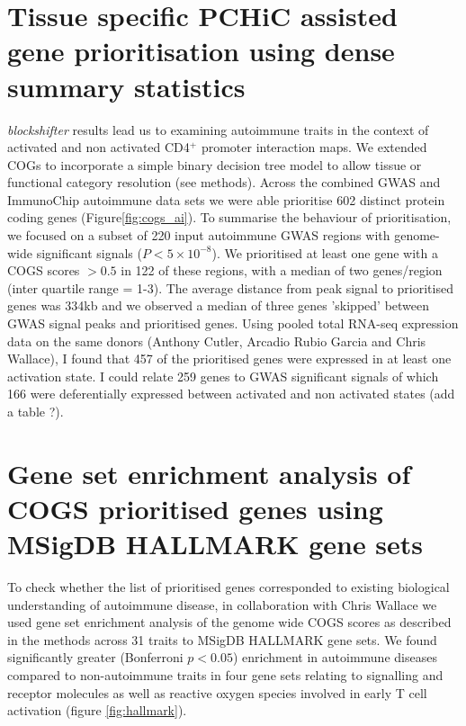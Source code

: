 \documentclass[a4paper,11pt]{report}
\begin{document}
\section{Tissue specific PCHiC assisted gene prioritisation using dense summary statistics}
\textit{blockshifter} results lead us to examining autoimmune traits in the context of activated and non activated CD4$^{+}$ promoter interaction maps. We extended COGs to  incorporate a simple binary decision tree model to allow tissue or functional category resolution (see methods).  Across the combined GWAS and ImmunoChip autoimmune data sets we were able prioritise 602 distinct protein coding genes  (Figure\ref{fig:cogs_ai}). To summarise the behaviour of prioritisation, we focused on a subset of 220 input autoimmune GWAS regions with genome-wide significant signals ($P<5 \times 10^{-8}$). We prioritised at least one gene with a COGS scores $>0.5$ in 122 of these regions, with a median of two genes/region (inter quartile range = 1-3). The average distance from peak signal to prioritised genes was 334kb and we observed a median of three genes 'skipped' between GWAS signal peaks and prioritised genes. Using pooled total RNA-seq expression data on the same donors (Anthony Cutler, Arcadio Rubio Garcia and Chris Wallace), I found that 457 of the prioritised genes were expressed in at least one activation state. I could relate 259 genes to GWAS significant signals of which 166 were deferentially expressed between activated and non activated states (add a table ?).

\section{Gene set enrichment analysis of COGS prioritised genes using MSigDB HALLMARK gene sets} 

To check whether the list of prioritised genes corresponded to existing biological understanding of autoimmune disease, in collaboration with Chris Wallace we used gene set enrichment analysis of the genome wide COGS scores as described in the methods  across 31 traits to MSigDB HALLMARK gene sets. We found significantly greater (Bonferroni $p<0.05$) enrichment in autoimmune diseases compared to non-autoimmune traits in four gene sets relating to signalling and receptor molecules as well as reactive oxygen species involved in early T cell activation (figure \ref{fig:hallmark}).
\end{document}
